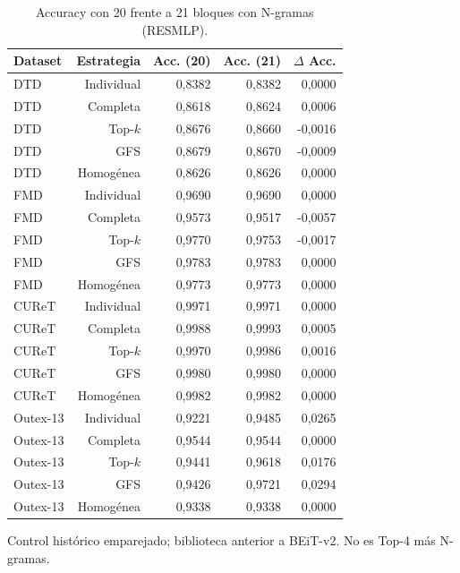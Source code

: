 \begin{table}[!htbp]\centering
\fontsize{8}{10}\selectfont\setlength{\tabcolsep}{4pt}
\caption{Accuracy con 20 frente a 21 bloques con N-gramas (RESMLP).}\label{tab:ngram-accuracy-resmlp}
\begin{tabular}{@{}lrrrr@{}}\toprule
Dataset & Estrategia & Acc. (20) & Acc. (21) & $\Delta$ Acc.\\\midrule
DTD & Individual & 0,8382 & 0,8382 & 0,0000\\
DTD & Completa & 0,8618 & 0,8624 & 0,0006\\
DTD & Top-$k$ & 0,8676 & 0,8660 & -0,0016\\
DTD & GFS & 0,8679 & 0,8670 & -0,0009\\
DTD & Homogénea & 0,8626 & 0,8626 & 0,0000\\
FMD & Individual & 0,9690 & 0,9690 & 0,0000\\
FMD & Completa & 0,9573 & 0,9517 & -0,0057\\
FMD & Top-$k$ & 0,9770 & 0,9753 & -0,0017\\
FMD & GFS & 0,9783 & 0,9783 & 0,0000\\
FMD & Homogénea & 0,9773 & 0,9773 & 0,0000\\
CUReT & Individual & 0,9971 & 0,9971 & 0,0000\\
CUReT & Completa & 0,9988 & 0,9993 & 0,0005\\
CUReT & Top-$k$ & 0,9970 & 0,9986 & 0,0016\\
CUReT & GFS & 0,9980 & 0,9980 & 0,0000\\
CUReT & Homogénea & 0,9982 & 0,9982 & 0,0000\\
Outex-13 & Individual & 0,9221 & 0,9485 & 0,0265\\
Outex-13 & Completa & 0,9544 & 0,9544 & 0,0000\\
Outex-13 & Top-$k$ & 0,9441 & 0,9618 & 0,0176\\
Outex-13 & GFS & 0,9426 & 0,9721 & 0,0294\\
Outex-13 & Homogénea & 0,9338 & 0,9338 & 0,0000\\
\bottomrule\end{tabular}
\par\smallskip\begin{minipage}{0.98\textwidth}\footnotesize Control histórico emparejado; biblioteca anterior a BEiT-v2. No es Top-4 más N-gramas.\end{minipage}
\end{table}
